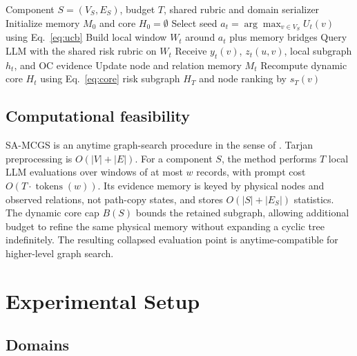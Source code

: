 \documentclass[11pt]{article}
\newcommand{\samcgs}{SA-MCGS}
\newcommand{\oc}{OC}
\begin{document}
\begin{algorithm}[t]
\small
\caption{\samcgs{} for one strongly connected component}
\label{alg:samcgs}
\begin{algorithmic}[1]
\REQUIRE Component $S=(V_S,E_S)$, budget $T$, shared rubric and domain serializer
\STATE Initialize memory $M_0$ and core $H_0=\emptyset$
    \STATE Select seed $a_t=\arg\max_{v\in V_S}U_t(v)$ using Eq.~\ref{eq:ucb}
    \STATE Build local window $W_t$ around $a_t$ plus memory bridges
    \STATE Query LLM with the shared risk rubric on $W_t$
    \STATE Receive $y_t(v)$, $z_t(u,v)$, local subgraph $h_t$, and \oc{} evidence
    \STATE Update node and relation memory $M_t$
    \STATE Recompute dynamic core $H_t$ using Eq.~\ref{eq:core}
\ENDFOR
\RETURN risk subgraph $H_T$ and node ranking by $s_T(v)$
\end{algorithmic}
\end{algorithm}

\subsection{Computational feasibility}

\samcgs{} is an anytime graph-search procedure in the sense of
\citet{zilberstein1996anytime}.  Tarjan preprocessing is
$O(|V|+|E|)$.  For a component $S$, the method performs $T$ local LLM
evaluations over windows of at most $w$ records, with prompt cost
$O(T\cdot\operatorname{tokens}(w))$.  Its evidence memory is keyed by
physical nodes and observed relations, not path-copy states, and stores
$O(|S|+|E_S|)$ statistics.  The dynamic core cap $B(S)$ bounds the
retained subgraph, allowing additional budget to refine the same physical
memory without expanding a cyclic tree indefinitely.  The resulting
collapsed evaluation point is anytime-compatible for higher-level graph search.

\section{Experimental Setup}
\label{sec:setup}

\subsection{Domains}
\end{document}
